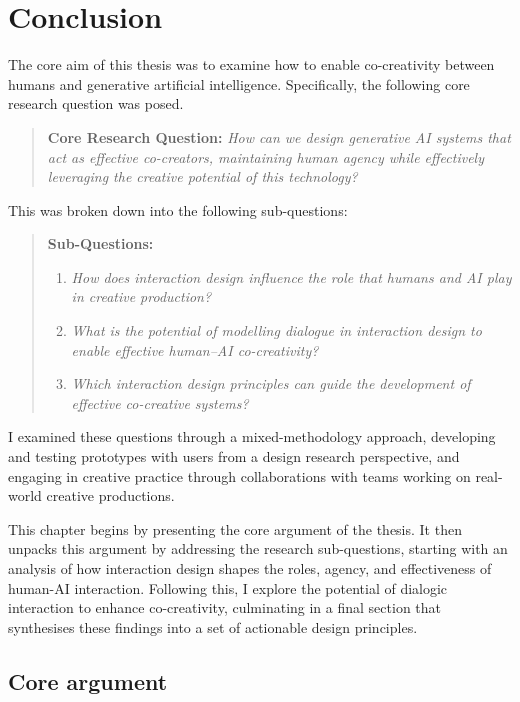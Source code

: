 \chapter[Conclusion]{Conclusion}\label{c:conclusion}

The core aim of this thesis was to examine how to enable co-creativity between humans and generative artificial intelligence. Specifically, the following core research question was posed.

\begin{quote}
\textbf{Core Research Question:}
\emph{How can we design generative AI systems that act as effective co-creators, maintaining human agency while effectively leveraging the creative potential of this technology?}
\end{quote}

This was broken down into the following sub-questions:

\begin{quote}
\textbf{Sub-Questions:}
\begin{enumerate}
    \item \emph{How does interaction design influence the role that humans and AI play in creative production?}
    \item \emph{What is the potential of modelling dialogue in interaction design to enable effective human–AI co-creativity?}
    \item \emph{Which interaction design principles can guide the development of effective co-creative systems?}
\end{enumerate}
\end{quote}

I examined these questions through a mixed-methodology approach, developing and testing prototypes with users from a design research perspective, and engaging in creative practice through collaborations with teams working on real-world creative productions.

This chapter begins by presenting the core argument of the thesis. It then unpacks this argument by addressing the research sub-questions, starting with an analysis of how interaction design shapes the roles, agency, and effectiveness of human-AI interaction. Following this, I explore the potential of dialogic interaction to enhance co-creativity, culminating in a final section that synthesises these findings into a set of actionable design principles.

\section{Core argument}

